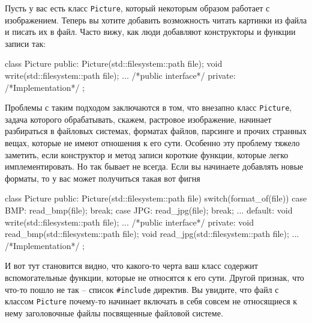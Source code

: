 Пусть у вас есть класс \verb"Picture", который некоторым образом работает с изображением.
Теперь вы хотите добавить возможность читать картинки из файла и писать их в файл.
Часто вижу, как люди добавляют конструкторы и функции записи так:
\begin{cppcode}
class Picture {
public:
  Picture(std::filesystem::path file);
  void write(std::filesystem::path file);
  ...
  /*public interface*/
private:
  /*Implementation*/
};
\end{cppcode}
Проблемы с таким подходом заключаются в том, что внезапно класс \verb"Picture", задача которого обрабатывать, скажем, растровое изображение, начинает разбираться в файловых системах, форматах файлов, парсинге и прочих странных вещах, которые не имеют отношения к его сути.
Особенно эту проблему тяжело заметить, если конструктор и метод записи короткие функции, которые легко имплементировать.
Но так бывает не всегда.
Если вы начинаете добавлять новые форматы, то у вас может получиться такая вот фигня
\begin{cppcode}
class Picture {
public:
  Picture(std::filesystem::path file) {
    switch(format_of(file)) {
      case BMP:
        read_bmp(file);
        break;
      case JPG:
        read_jpg(file);
        break;
        ...
      default:
    }
  }
  void write(std::filesystem::path file);
  ...
  /*public interface*/
private:
  void read_bmp(std::filesystem::path file);
  void read_jpg(std::filesystem::path file);
  ...
  /*Implementation*/
};
\end{cppcode}
И вот тут становится видно, что какого-то черта ваш класс содержит вспомогательные функции, которые не относятся к его сути.
Другой признак, что что-то пошло не так -- список \verb"#include" директив.
Вы увидите, что файл с классом \verb"Picture" почему-то начинает включать в себя совсем не относящиеся к нему заголовочные файлы посвященные файловой системе.

